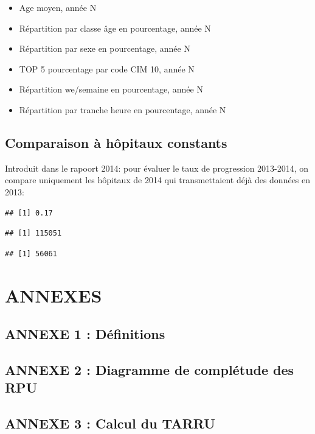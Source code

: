 \documentclass[]{article}
\begin{document}
\begin{itemize}
\itemsep1pt\parskip0pt
\item
  Age moyen, année N
\item
  Répartition par classe âge en pourcentage, année N
\item
  Répartition par sexe en pourcentage, année N
\item
  TOP 5 pourcentage par code CIM 10, année N
\item
  Répartition we/semaine en pourcentage, année N
\item
  Répartition par tranche heure en pourcentage, année N
\end{itemize}

\subsection{Comparaison à hôpitaux
constants}\label{comparaison-a-hopitaux-constants}

Introduit dans le rapoort 2014: pour évaluer le taux de progression
2013-2014, on compare uniquement les hôpitaux de 2014 qui transmettaient
déjà des données en 2013:

\begin{verbatim}
## [1] 0.17
\end{verbatim}

\begin{verbatim}
## [1] 115051
\end{verbatim}

\begin{verbatim}
## [1] 56061
\end{verbatim}

\section{ANNEXES}\label{annexes}

\subsection{ANNEXE 1 : Définitions}\label{annexe-1-definitions}

\subsection{ANNEXE 2 : Diagramme de complétude des
RPU}\label{annexe-2-diagramme-de-completude-des-rpu}

\subsection{ANNEXE 3 : Calcul du TARRU}\label{annexe-3-calcul-du-tarru}
\end{document}
